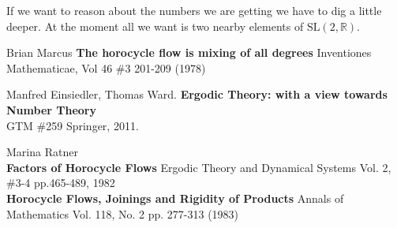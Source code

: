 \documentclass[12pt]{article}
\begin{document}
If we want to reason about the numbers we are getting we have to dig a little deeper.  At the moment all we want is two nearby elements of $\text{SL}(2, \mathbb{R})$.
\vfill
\begin{thebibliography}{} 

\item Brian Marcus \textbf{The horocycle flow is mixing of all degrees} Inventiones Mathematicae, Vol 46 \#3 201-209 (1978)

\item Manfred Einsiedler, Thomas Ward. \textbf{Ergodic Theory: with a view towards Number Theory} \\GTM \#259 Springer, 2011.

\item Marina Ratner \\ 
\textbf{Factors of Horocycle Flows}  Ergodic Theory and Dynamical Systems  Vol. 2, \#3-4 pp.465-489, 1982 \\
\textbf{Horocycle Flows, Joinings and Rigidity of Products} Annals of Mathematics Vol. 118, No. 2 pp. 277-313 (1983)

\end{thebibliography}
\end{document}

